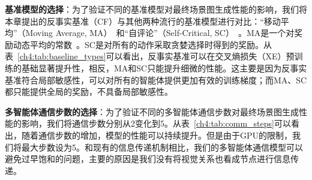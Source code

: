 \textbf{基准模型的选择}：为了验证不同的基准模型对最终场景图生成性能的影响，我们将本章提出的反事实基准（CF）与其他两种流行的基准模型进行对比：“移动平均”（Moving Average, MA）~\cite{weaver2013optimal}和“自评论”（Self-Critical, SC）~\cite{rennie2017self}。MA是一个对奖励动态平均的常数~\cite{xu2015show, hu2017learning}。SC是对所有的动作采取贪婪选择时得到的奖励。从表~\ref{ch4:tab:baseline_types}可以看出，反事实基准可以在交叉熵损失（XE）预训练的基础显著提升性，相反，MA和SC只能提升细微的性能。这主要是因为反事实基准符合局部敏感性，可以对所有的智能体提供更加有效的训练梯度；而MA、SC都只能提供全局的奖励，不具备局部敏感性。


\begin{table}[htbp]
\begin{center}
\end{center}
\caption{不同基准模型对性能的影响}
\label{ch4:tab:baseline_types}
\end{table}

\textbf{多智能体通信步数的选择}：为了验证不同的多智能体通信步数对最终场景图生成性能的影响，我们将通信步数分别从2变化到5。从表~\ref{ch4:tab:comm_steps}可以看出，随着通信步数的增加，模型的性能可以持续提升。但是由于GPU的限制，我们将最大步数设为5。和现有的信息传递机制相比，我们的多智能体通信模型可以避免过早饱和的问题，主要的原因是我们没有将视觉关系也看成节点进行信息传递。

